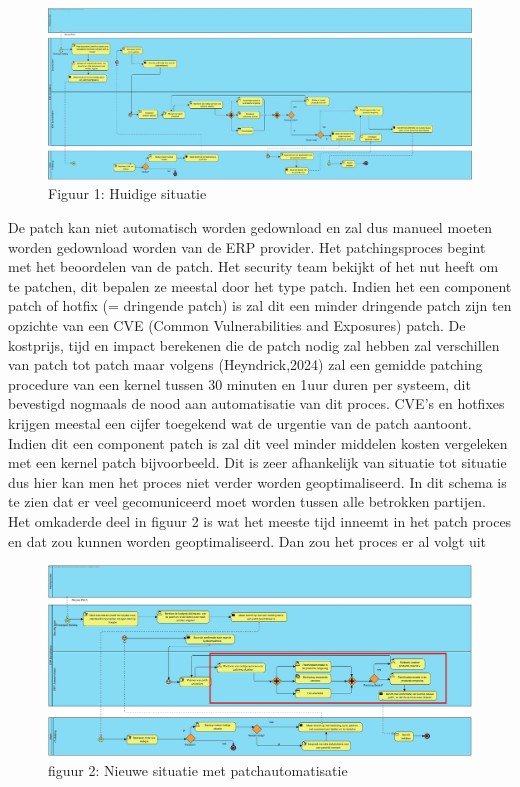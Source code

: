 \documentclass[dutch,dit,thesis]{hogentreport}
\begin{document}
\begin{figure}[htbp]
    \centering
    \includegraphics[width=\textwidth]{huidigesituatie.jpg}
    \caption{Figuur 1: Huidige situatie}
    \label{fig:huidigesituatie}
\end{figure}

De patch kan niet automatisch worden gedownload en zal dus manueel moeten worden gedownload worden van de ERP provider. Het patchingsproces begint met het beoordelen van de patch. Het security team bekijkt of het nut heeft
om te patchen, dit bepalen ze meestal door het type patch. Indien het een component patch of hotfix (= dringende patch) is zal dit een minder dringende patch zijn ten opzichte van een CVE (Common Vulnerabilities and Exposures) patch. De kostprijs, tijd en impact berekenen
die de patch nodig zal hebben zal verschillen van patch tot patch maar volgens (Heyndrick,2024) zal een gemidde patching procedure van een kernel tussen 30 minuten en 1uur duren per systeem, dit bevestigd nogmaals de nood aan automatisatie van dit proces. CVE's en hotfixes krijgen meestal een cijfer toegekend wat de urgentie van de patch aantoont. Indien dit een component patch is zal dit veel minder middelen kosten vergeleken
met een kernel patch bijvoorbeeld. Dit is zeer afhankelijk van situatie tot situatie dus hier kan men het proces niet verder worden geoptimaliseerd. In dit schema is te zien dat er veel gecomuniceerd moet worden tussen alle betrokken partijen. \\


Het omkaderde deel in figuur 2 is wat het meeste tijd inneemt in het patch proces en dat zou kunnen worden geoptimaliseerd. Dan zou het proces er al volgt uit


 \begin{figure}[htbp]
    \centering
    \includegraphics[width=\textwidth]{huidigesituatie2.png}
    \caption{figuur 2: Nieuwe situatie met patchautomatisatie}
     \label{fig:huidigesituatie2}
\end{figure}
\end{document}
